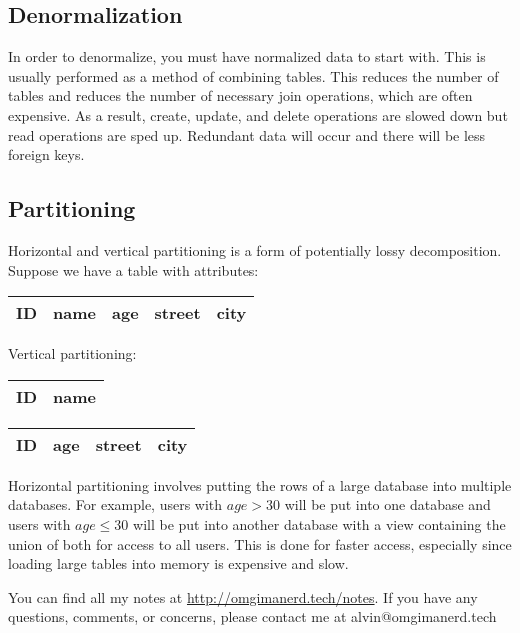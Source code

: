 \documentclass{math}
\begin{document}
\subsection*{Denormalization}
In order to denormalize, you must have normalized data to start with. This is
usually performed as a method of combining tables. This reduces the number of
tables and reduces the number of necessary join operations, which are often
expensive. As a result, create, update, and delete operations are slowed down
but read operations are sped up. Redundant data will occur and there will be
less foreign keys.

\subsection*{Partitioning}
Horizontal and vertical partitioning is a form of potentially lossy
decomposition. Suppose we have a table with attributes:
\begin{center}
  \begin{tabular}{|c|c|c|c|c|}
    \hline
    ID & name & age & street & city \\
    \hline
  \end{tabular}
\end{center}
Vertical partitioning:
\begin{center}
  \begin{tabular}{|c|c|}
    \hline
    ID & name \\
    \hline
  \end{tabular} \quad
  \begin{tabular}{|c|c|c|c|}
    \hline
    ID & age & street & city \\
    \hline
  \end{tabular}
\end{center}
Horizontal partitioning involves putting the rows of a large database into
multiple databases. For example, users with \( age > 30 \) will be put into one
database and users with \( age \le 30 \) will be put into another database with
a view containing the union of both for access to all users. This is done for
faster access, especially since loading large tables into memory is expensive
and slow.

\begin{center}
  You can find all my notes at \url{http://omgimanerd.tech/notes}. If you have
  any questions, comments, or concerns, please contact me at
  alvin@omgimanerd.tech
\end{center}
\end{document}
